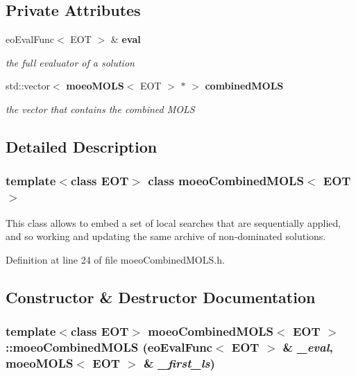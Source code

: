 \subsection*{Private Attributes}
\begin{CompactItemize}
\item 
eo\-Eval\-Func$<$ EOT $>$ \& {\bf eval}\label{classmoeoCombinedMOLS_b2c0866a1808022bd3a9dac89e528a01}

\begin{CompactList}\small\item\em the full evaluator of a solution \item\end{CompactList}\item 
std::vector$<$ {\bf moeo\-MOLS}$<$ EOT $>$ $\ast$ $>$ {\bf combined\-MOLS}\label{classmoeoCombinedMOLS_a5ccc182c0d61421fc524c2da3671099}

\begin{CompactList}\small\item\em the vector that contains the combined MOLS \item\end{CompactList}\end{CompactItemize}


\subsection{Detailed Description}
\subsubsection*{template$<$class EOT$>$ class moeo\-Combined\-MOLS$<$ EOT $>$}

This class allows to embed a set of local searches that are sequentially applied, and so working and updating the same archive of non-dominated solutions. 



Definition at line 24 of file moeo\-Combined\-MOLS.h.

\subsection{Constructor \& Destructor Documentation}
\subsubsection{\setlength{\rightskip}{0pt plus 5cm}template$<$class EOT$>$ {\bf moeo\-Combined\-MOLS}$<$ EOT $>$::{\bf moeo\-Combined\-MOLS} (eo\-Eval\-Func$<$ EOT $>$ \& {\em \_\-eval}, {\bf moeo\-MOLS}$<$ EOT $>$ \& {\em \_\-first\_\-ls})\hspace{0.3cm}{\tt  [inline]}}\label{classmoeoCombinedMOLS_9305380cd8f5a4d85ef603fa85c1860b}


